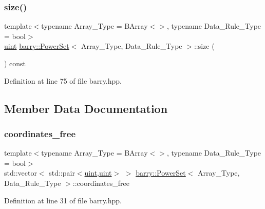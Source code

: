 \subsubsection{\texorpdfstring{size()}{size()}}
{\footnotesize\ttfamily template$<$typename Array\+\_\+\+Type  = B\+Array$<$$>$, typename Data\+\_\+\+Rule\+\_\+\+Type  = bool$>$ \\
\hyperlink{namespacebarry_a11dfc53ddb4672278319aa04f1e09a6c}{uint} \hyperlink{classbarry_1_1_power_set}{barry\+::\+Power\+Set}$<$ Array\+\_\+\+Type, Data\+\_\+\+Rule\+\_\+\+Type $>$\+::size (\begin{DoxyParamCaption}{ }\end{DoxyParamCaption}) const\hspace{0.3cm}{\ttfamily [inline]}}



Definition at line 75 of file barry.\+hpp.



\subsection{Member Data Documentation}
\mbox{\label{classbarry_1_1_power_set_a2bc42422f23546d55fef96f053c0c4ea}} 
\subsubsection{\texorpdfstring{coordinates\+\_\+free}{coordinates\_free}}
{\footnotesize\ttfamily template$<$typename Array\+\_\+\+Type  = B\+Array$<$$>$, typename Data\+\_\+\+Rule\+\_\+\+Type  = bool$>$ \\
std\+::vector$<$ std\+::pair$<$\hyperlink{namespacebarry_a11dfc53ddb4672278319aa04f1e09a6c}{uint},\hyperlink{namespacebarry_a11dfc53ddb4672278319aa04f1e09a6c}{uint}$>$ $>$ \hyperlink{classbarry_1_1_power_set}{barry\+::\+Power\+Set}$<$ Array\+\_\+\+Type, Data\+\_\+\+Rule\+\_\+\+Type $>$\+::coordinates\+\_\+free}



Definition at line 31 of file barry.\+hpp.

\mbox{\label{classbarry_1_1_power_set_a46fa867445a84be388ee62602922980a}} 
